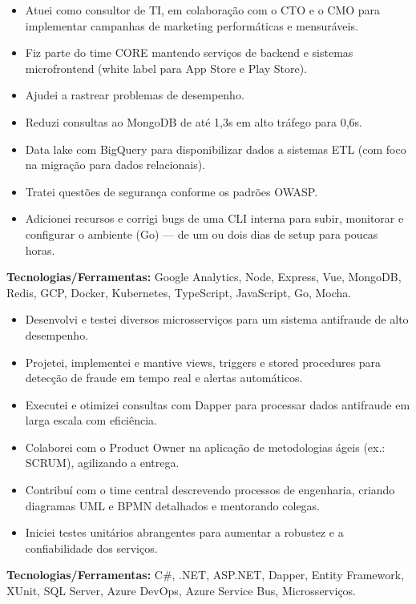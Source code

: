 \documentclass[10pt,a4paper]{altacv}
\begin{document}
\begin{itemize}
    \setlength{\itemindent}{0.5em}
    \item[--] Atuei como consultor de TI, em colaboração com o CTO e o CMO para implementar campanhas de marketing performáticas e mensuráveis.
    \item[--] Fiz parte do time CORE mantendo serviços de backend e sistemas microfrontend (white label para App Store e Play Store).
    \item[--] Ajudei a rastrear problemas de desempenho.
    \item[--] Reduzi consultas ao MongoDB de até 1,3s em alto tráfego para 0,6s.
    \item[--] Data lake com BigQuery para disponibilizar dados a sistemas ETL (com foco na migração para dados relacionais).
    \item[--] Tratei questões de segurança conforme os padrões OWASP.
    \item[--] Adicionei recursos e corrigi bugs de uma CLI interna para subir, monitorar e configurar o ambiente (Go) — de um ou dois dias de setup para poucas horas.
\end{itemize}
\textbf{Tecnologias/Ferramentas:} Google Analytics, Node, Express, Vue, MongoDB, Redis, GCP, Docker, Kubernetes, TypeScript, JavaScript, Go, Mocha.
\vspace{5mm}


\begin{itemize}
    \setlength{\itemindent}{0.5em}
    \item[--] Desenvolvi e testei diversos microsserviços para um sistema antifraude de alto desempenho.
    \item[--] Projetei, implementei e mantive views, triggers e stored procedures para detecção de fraude em tempo real e alertas automáticos.
    \item[--] Executei e otimizei consultas com Dapper para processar dados antifraude em larga escala com eficiência.
    \item[--] Colaborei com o Product Owner na aplicação de metodologias ágeis (ex.: SCRUM), agilizando a entrega.
    \item[--] Contribuí com o time central descrevendo processos de engenharia, criando diagramas UML e BPMN detalhados e mentorando colegas.
    \item[--] Iniciei testes unitários abrangentes para aumentar a robustez e a confiabilidade dos serviços.
\end{itemize}
\textbf{Tecnologias/Ferramentas:} C\#, .NET, ASP.NET, Dapper, Entity Framework, XUnit, SQL Server, Azure DevOps, Azure Service Bus, Microsserviços.
\vspace{5mm}
\end{document}
